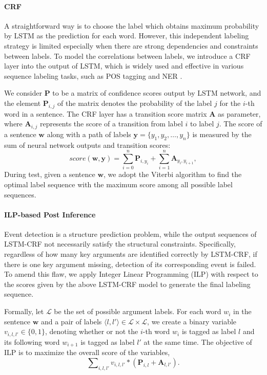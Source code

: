 \paragraph{CRF}
A straightforward way is to choose the label which obtains maximum probability by LSTM as the prediction for each word. However, this independent labeling strategy is limited especially when there are strong dependencies and constraints between labels. To model the correlations between labels, we introduce a CRF layer into the output of LSTM, which is widely used and effective in various sequence labeling tasks, such as POS tagging and NER \cite{collobert2011natural,huang2015bidirectional}.

We consider $\textbf{P}$ to be a matrix of confidence scores output by LSTM network, and the element $\textbf{P}_{i,j}$ of the matrix denotes the probability of the label $j$ for the $i$-th word in a sentence. The CRF layer has a transition score matrix $\textbf{A}$ as parameter, where $\textbf{A}_{i,j}$ represents the score of a transition from label $i$ to label $j$. The score of a sentence $\bm{w}$ along with a path of labels $\bm{y} = \{y_1, y_2, \ldots, y_n\}$ is measured by the sum of neural network outputs and transition scores: 
\begin{equation}
	score(\bm{w}, \bm{y}) = \sum\limits_{i=0}^n\textbf{P}_{i, y_i} + \sum\limits_{i=1}^n\textbf{A}_{y_i, y_{i+1}},
\end{equation}
During test, given a sentence $\bm{w}$, we adopt the Viterbi algorithm \cite{rabiner1989tutorial} to find the optimal label sequence with the maximum score among all possible label sequences.

\paragraph{ILP-based Post Inference}
Event detection is a structure prediction problem, while the output sequences of LSTM-CRF not necessarily satisfy the structural constraints. Specifically, regardless of how many key arguments are identified correctly by LSTM-CRF, if there is one key argument missing, detection of its corresponding event is failed. To amend this flaw, we apply Integer Linear Programming (ILP) with respect to the scores given by the above LSTM-CRF model to generate the final labeling sequence.

Formally, let $\mathcal{L}$ be the set of possible argument labels. For each word $w_i$ in the sentence $\bm{w}$ and a pair of labels $ \langle l, l' \rangle \in \mathcal{L} \times \mathcal{L}$, we create a binary variable ${v_{i,l,l'} \in \{0, 1\}}$, denoting whether or not the $i$-th word $w_i$ is tagged as label $l$ and its following word $w_{i+1}$ is tagged as label $l'$ at the same time. The objective of ILP is to maximize the overall score of the variables,
\begin{displaymath}
	\sum\nolimits_{i, l, l'}v_{i,l,l'} * (\textbf{P}_{i,l}+\textbf{A}_{l,l'}) .
\end{displaymath}

